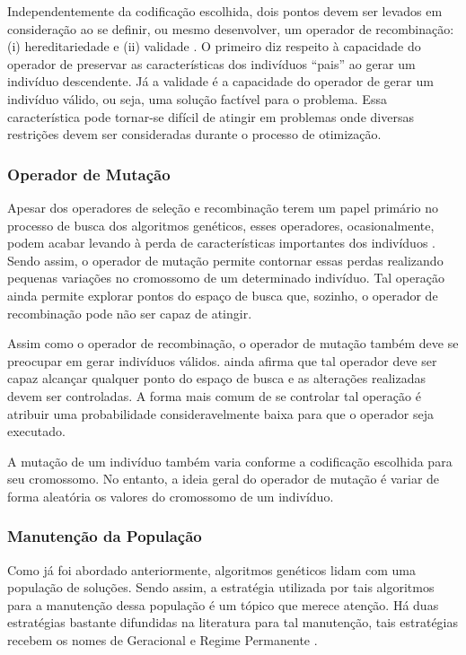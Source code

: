Independentemente da codificação escolhida, dois pontos devem ser levados em consideração ao se definir, ou mesmo desenvolver, um operador de recombinação: (i) hereditariedade e (ii) validade \cite{Talbi2009}. O primeiro diz respeito à capacidade do operador de preservar as características dos indivíduos “pais” ao gerar um indivíduo descendente. Já a validade é a capacidade do operador de gerar um indivíduo válido, ou seja, uma solução factível para o problema. Essa característica pode tornar-se difícil de atingir em problemas onde diversas restrições devem ser consideradas durante o processo de otimização.

\subsubsection{Operador de Mutação}

Apesar dos operadores de seleção e recombinação terem um papel primário no processo de busca dos algoritmos genéticos, esses operadores, ocasionalmente, podem acabar levando à perda de características importantes dos indivíduos \cite{Goldberg1989}. Sendo assim, o operador de mutação permite contornar essas perdas realizando pequenas variações no cromossomo de um determinado indivíduo. Tal operação ainda permite explorar pontos do espaço de busca que, sozinho, o operador de recombinação pode não ser capaz de atingir.

Assim como o operador de recombinação, o operador de mutação também deve se preocupar em gerar indivíduos válidos. \cite{Talbi2009} ainda afirma que tal operador deve ser capaz alcançar qualquer ponto do espaço de busca e as alterações realizadas devem ser controladas. A forma mais comum de se controlar tal operação é atribuir uma probabilidade consideravelmente baixa para que o operador seja executado.

A mutação de um indivíduo também varia conforme a codificação escolhida para seu cromossomo. No entanto, a ideia geral do operador de mutação é variar de forma aleatória os valores do cromossomo de um indivíduo. 

\subsubsection{Manutenção da População}

Como já foi abordado anteriormente, algoritmos genéticos lidam com uma população de soluções. Sendo assim, a estratégia utilizada por tais algoritmos para a manutenção dessa população é um tópico que merece atenção. Há duas estratégias bastante difundidas na literatura para tal manutenção, tais estratégias recebem os nomes de Geracional e Regime Permanente \cite{Kacprzyk2015}.

